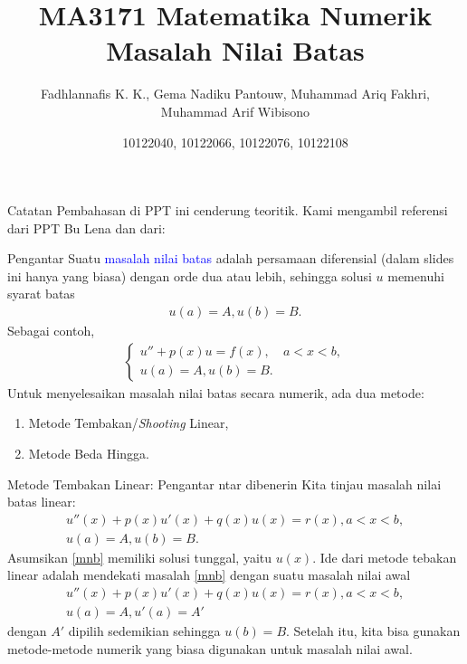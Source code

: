 \documentclass[xcolor={dvipsnames}, 9pt]{beamer}
\title{MA3171 Matematika Numerik \\ \textbf{Masalah Nilai Batas}}
\author{Fadhlannafis K. K., Gema Nadiku Pantouw, Muhammad Ariq Fakhri, Muhammad Arif Wibisono}
\date{10122040, 10122066, 10122076, 10122108}
\renewcommand{\emph}[1]{\textcolor{Blue}{#1}}
\begin{document}
	\begin{frame}[plain]
		\maketitle
	\end{frame}
	\begin{frame}{Catatan}
		Pembahasan di PPT ini cenderung teoritik. Kami mengambil referensi dari PPT Bu Lena dan dari:
		\nocite{*}
		\printbibliography
	\end{frame}
	\begin{frame}{Pengantar}
		Suatu \emph{masalah nilai batas} adalah persamaan diferensial (dalam slides ini hanya yang biasa) dengan orde dua atau lebih, sehingga solusi $u$ memenuhi syarat batas
		\begin{align*}
			u(a) = A, u(b) = B.
		\end{align*}
		Sebagai contoh,
		\begin{align*}
			\begin{cases}
				u'' + p(x)u = f(x), & a<x<b, \\
				u(a) = A, u(b) = B.
			\end{cases}
		\end{align*}
		Untuk menyelesaikan masalah nilai batas secara numerik, ada dua metode:
		\begin{enumerate}
			\item Metode Tembakan/\textit{Shooting} Linear,
			\item Metode Beda Hingga.
		\end{enumerate}
	\end{frame}
	\begin{frame}{Metode Tembakan Linear: Pengantar}
		ntar dibenerin \newline
		Kita tinjau masalah nilai batas linear:
		\begin{gather}
			u''(x) + p(x)u'(x) + q(x)u(x) = r(x), a<x<b, \label{mnb} \\
			u(a) = A, u(b) = B. \nonumber
		\end{gather}
		Asumsikan \eqref{mnb} memiliki solusi tunggal, yaitu $u(x)$. Ide dari metode tebakan linear adalah mendekati masalah \eqref{mnb} dengan suatu masalah nilai awal
		\begin{gather}
			u''(x) + p(x)u'(x) + q(x)u(x) = r(x), a<x<b, \label{mna} \\
			u(a) = A, u'(a) = A' \nonumber
		\end{gather}
		dengan $A'$ dipilih sedemikian sehingga $u(b)=B$. Setelah itu, kita bisa gunakan metode-metode numerik yang biasa digunakan untuk masalah nilai awal.
	\end{frame}
\end{document}
